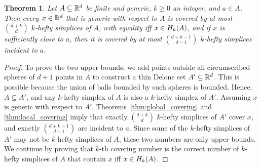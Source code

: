 \documentclass[10pt,a4paper]{article}
\newtheorem{theorem}{Theorem}[section]
\newcommand {\mm}[1] {\ifmmode{#1}\else{\mbox{\(#1\)}}\fi}
\theoremstyle{plain}
\newcommand{\Rspace}        {\mm{{\mathbb R}}}
\newcommand{\Hull}[2]       {\mm{{H}_{#1}{({#2})}}}
\begin{document}
\begin{theorem}
  \label{thm:covering_for_finite_sets}
  Let $A \subseteq \Rspace^d$ be finite and generic, $k \geq 0$ an integer, and $a \in A$.
  Then every $x \in \Rspace^d$ that is generic with respect to $A$ is covered by at most $\binom{d+k}{d}$ $k$-hefty simplices of $A$, with equality iff $x \in \Hull{k}{A}$, and if $x$ is sufficiently close to $a$, then it is covered by at most $\binom{d+k-1}{d-1}$ $k$-hefty simplices incident to $a$.
\end{theorem}

\begin{proof}
  To prove the two upper bounds, we add points outside all circumscribed spheres of $d+1$ points in $A$ to construct a thin Delone set $A' \subseteq \Rspace^d$.
  This is possible because the union of balls bounded by such spheres is bounded.
  Hence, $A \subseteq A'$, and any $k$-hefty simplex of $A$ is also a $k$-hefty simplex of $A'$.
  Assuming $x$ is generic with respect to $A'$, Theorems~\ref{thm:global_covering} and \ref{thm:local_covering} imply that exactly $\binom{d+k}{d}$ $k$-hefty simplices of $A'$ cover $x$, and exactly $\binom{d+k-1}{d-1}$ are incident to $a$.
  Since some of the $k$-hefty simplices of $A'$ may not be $k$-hefty simplices of $A$, these two numbers are only upper bounds.
  We continue by proving that $k$-th covering number is the correct number of $k$-hefty simplices of $A$ that contain $x$ iff $x \in \Hull{k}{A}$.
    

\end{proof}
\end{document}
